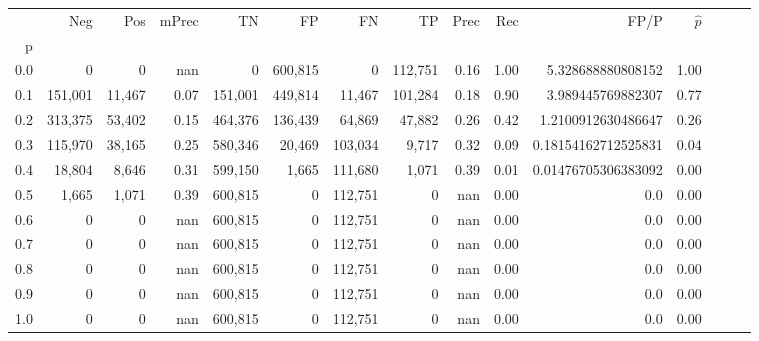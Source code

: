 \begin{tabular}{rrrrrrrrrrrrrrr}
\toprule
{} &      Neg &     Pos & mPrec &       TN &       FP &       FN &       TP &  Prec &   Rec &                 FP/P & $\hat{p}$ \\
p   &          &         &       &          &          &          &          &       &       &                      &           \\
\midrule
0.0 &        0 &       0 &   nan &        0 &  600,815 &        0 &  112,751 &  0.16 &  1.00 &    5.328688880808152 &      1.00 \\
0.1 &  151,001 &  11,467 &  0.07 &  151,001 &  449,814 &   11,467 &  101,284 &  0.18 &  0.90 &    3.989445769882307 &      0.77 \\
0.2 &  313,375 &  53,402 &  0.15 &  464,376 &  136,439 &   64,869 &   47,882 &  0.26 &  0.42 &   1.2100912630486647 &      0.26 \\
0.3 &  115,970 &  38,165 &  0.25 &  580,346 &   20,469 &  103,034 &    9,717 &  0.32 &  0.09 &  0.18154162712525831 &      0.04 \\
0.4 &   18,804 &   8,646 &  0.31 &  599,150 &    1,665 &  111,680 &    1,071 &  0.39 &  0.01 &  0.01476705306383092 &      0.00 \\
0.5 &    1,665 &   1,071 &  0.39 &  600,815 &        0 &  112,751 &        0 &   nan &  0.00 &                  0.0 &      0.00 \\
0.6 &        0 &       0 &   nan &  600,815 &        0 &  112,751 &        0 &   nan &  0.00 &                  0.0 &      0.00 \\
0.7 &        0 &       0 &   nan &  600,815 &        0 &  112,751 &        0 &   nan &  0.00 &                  0.0 &      0.00 \\
0.8 &        0 &       0 &   nan &  600,815 &        0 &  112,751 &        0 &   nan &  0.00 &                  0.0 &      0.00 \\
0.9 &        0 &       0 &   nan &  600,815 &        0 &  112,751 &        0 &   nan &  0.00 &                  0.0 &      0.00 \\
1.0 &        0 &       0 &   nan &  600,815 &        0 &  112,751 &        0 &   nan &  0.00 &                  0.0 &      0.00 \\
\bottomrule
\end{tabular}
